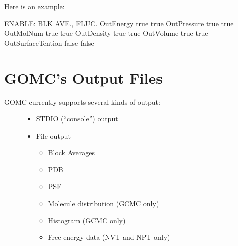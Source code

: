 \documentclass[letterpaper,10pt,english]{sphinxmanual}
\begin{document}
\begin{description}
Here is an example:

\begin{sphinxVerbatim}[commandchars=\\\{\}]
\PYGZsh{}\PYGZsh{}\PYGZsh{}\PYGZsh{}\PYGZsh{}\PYGZsh{}\PYGZsh{}\PYGZsh{}\PYGZsh{}\PYGZsh{}\PYGZsh{}\PYGZsh{}\PYGZsh{}\PYGZsh{}\PYGZsh{}\PYGZsh{}\PYGZsh{}\PYGZsh{}\PYGZsh{}\PYGZsh{}\PYGZsh{}\PYGZsh{}\PYGZsh{}\PYGZsh{}\PYGZsh{}\PYGZsh{}\PYGZsh{}\PYGZsh{}\PYGZsh{}\PYGZsh{}\PYGZsh{}\PYGZsh{}\PYGZsh{}
\PYGZsh{} ENABLE: BLK AVE., FLUC.
\PYGZsh{}\PYGZsh{}\PYGZsh{}\PYGZsh{}\PYGZsh{}\PYGZsh{}\PYGZsh{}\PYGZsh{}\PYGZsh{}\PYGZsh{}\PYGZsh{}\PYGZsh{}\PYGZsh{}\PYGZsh{}\PYGZsh{}\PYGZsh{}\PYGZsh{}\PYGZsh{}\PYGZsh{}\PYGZsh{}\PYGZsh{}\PYGZsh{}\PYGZsh{}\PYGZsh{}\PYGZsh{}\PYGZsh{}\PYGZsh{}\PYGZsh{}\PYGZsh{}\PYGZsh{}\PYGZsh{}\PYGZsh{}\PYGZsh{}
OutEnergy         true true
OutPressure       true true
OutMolNum         true true
OutDensity        true true
OutVolume         true true
OutSurfaceTention false false
\end{sphinxVerbatim}

\end{description}


\chapter{GOMC’s Output Files}
\label{\detokenize{output_file:gomc-s-output-files}}\label{\detokenize{output_file::doc}}\begin{description}
\item[{GOMC currently supports several kinds of output:}] \leavevmode\begin{itemize}
\item {} 
STDIO (“console”) output

\item {} 
File output
\begin{itemize}
\item {} 
Block Averages

\item {} 
PDB

\item {} 
PSF

\item {} 
Molecule distribution (GCMC only)

\item {} 
Histogram (GCMC only)

\item {} 
Free energy data (NVT and NPT only)

\end{itemize}

\end{itemize}

\end{description}
\end{document}
